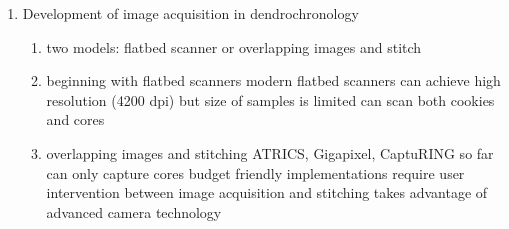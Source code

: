 \documentclass{article}
\begin{document}
\begin{outline}[enumerate]
\begin{enumerate}
\begin{enumerate}
		\item Development of image acquisition in dendrochronology 
			\begin{enumerate}
			\item two models: flatbed scanner or overlapping images and stitch
			\item beginning with flatbed scanners %
				\subitem modern flatbed scanners can achieve high resolution (4200 dpi) but size of samples is limited %
				\subitem can scan both cookies and cores	
			\item overlapping images and stitching 
				\subitem ATRICS, Gigapixel, CaptuRING 
				\subitem so far can only capture cores
				\subitem budget friendly implementations require user intervention between image acquisition and stitching
				\subitem takes advantage of advanced camera technology
			\end{enumerate}
		\end{enumerate}
	

\end{enumerate}
\end{outline}
\end{document}
